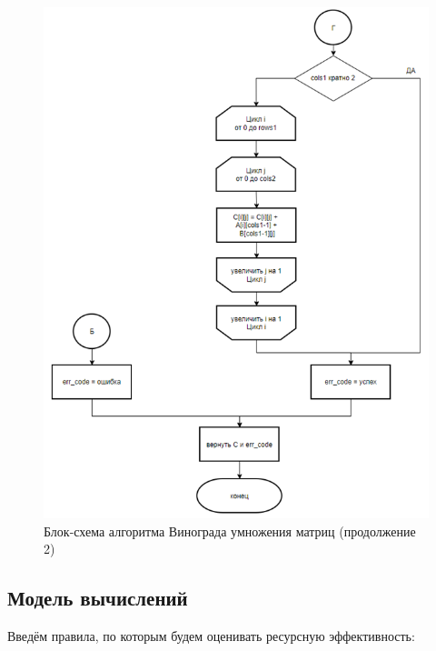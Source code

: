 \begin{figure}[H]
    \centering
    \includegraphics[width=1.02\textwidth]{img/block_2_3.png}
    \caption{Блок-схема алгоритма Винограда умножения матриц (продолжение 2)}
    \label{fig:block_2_3}
\end{figure}

\subsection{Модель вычислений}

Введём правила, по которым будем оценивать ресурсную эффективность:

